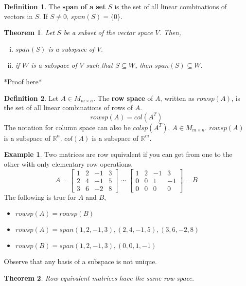 \documentclass{report}
\newtheorem{_thm}{Theorem}
\theoremstyle{definition}
\newtheorem{_def}{Definition}
\newtheorem{ex}{Example}
\begin{document}
\begin{_def}
The \textbf{span of a set} $S$ is the set of all linear combinations of vectors in $S$.
If $S\neq 0$, $span(S)=\{0\}$.
\end{_def}

\begin{_thm}
Let $S$ be a subset of the vector space $V$.
Then,
\begin{enumerate}[i)]
 \item $span(S)$ is a subspace of $V$.
 \item if $W$ is a subspace of $V$ such that $S\subseteq W$, then $span(S)\subseteq W$.
\end{enumerate}
\end{_thm}

*Proof here*

\begin{_def}
Let $A\in M_{m\times n}$.
The \textbf{row space} of $A$, written as $rowsp(A)$, is the set of all linear combinations of rows of $A$.
\[rowsp(A)=col(A^T)\]
The notation for column space can also be $colsp(A^T)$.
$A\in M_{m\times n}$.
$rowsp(A)$ is a subspace of $\mathbb{R}^n$.
$col(A)$ is a subspace of $\mathbb{R}^m$.
\end{_def}

\begin{ex}
Two matrices are row equivalent if you can get from one to the other with only elementary row operations.
\[A=
\begin{bmatrix}
1 & 2 & -1 & 3 \\
2 & 4 & -1 & 5 \\
3 & 6 & -2 & 8
\end{bmatrix}\sim
\begin{bmatrix}
1 & 2 & -1 & 3 \\
0 & 0 & 1 & -1 \\
0 & 0 & 0 & 0
\end{bmatrix}=B
\]
The following is true for $A$ and $B$,
\begin{itemize}
 \item $rowsp(A)=rowsp(B)$
 \item $rowsp(A)=span{(1,2,-1,3),(2,4,-1,5),(3,6,-2,8)}$
 \item $rowsp(B)=span{(1,2,-1,3),(0,0,1,-1)}$
\end{itemize}
Observe that any basis of a subspace is not unique.
\end{ex}

\begin{_thm}
Row equivalent matrices have the same row space.
\end{_thm}
\end{document}
